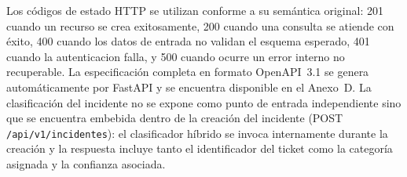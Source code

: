 Los códigos de estado HTTP se utilizan conforme a su semántica original: 201 cuando un recurso se crea exitosamente, 200 cuando una consulta se atiende con éxito, 400 cuando los datos de entrada no validan el esquema esperado, 401 cuando la autenticacion falla, y 500 cuando ocurre un error interno no recuperable. La especificación completa en formato OpenAPI~3.1 se genera automáticamente por FastAPI y se encuentra disponible en el Anexo~D. La clasificación del incidente no se expone como punto de entrada independiente sino que se encuentra embebida dentro de la creación del incidente (POST \texttt{/api/v1/incidentes}): el clasificador híbrido se invoca internamente durante la creación y la respuesta incluye tanto el identificador del ticket como la categoría asignada y la confianza asociada.

\newpage
